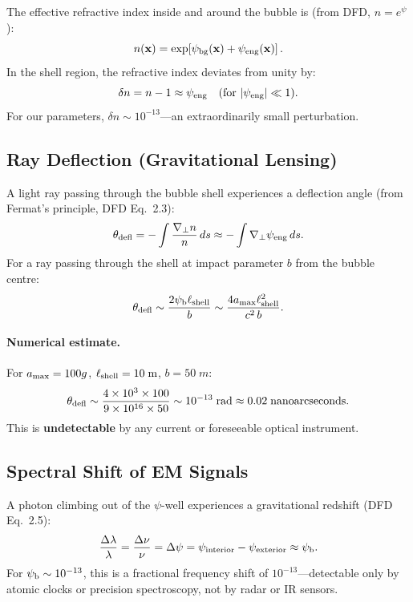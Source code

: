 \documentclass[12pt,aps,prd,superscriptaddress,nofootinbib]{revtex4-2}
\newcommand{\psib}{\psi_{\rm b}}
\newcommand{\Lshell}{\ell_{\rm shell}}
\begin{document}
The effective refractive index inside and around the bubble is
(from DFD, $n = e^{\psi}$):
\begin{equation}
n(\mathbf{x}) = \exp\!\left[\psi_{\rm bg}(\mathbf{x})
  + \psi_{\rm eng}(\mathbf{x})\right].
\end{equation}
In the shell region, the refractive index deviates from unity by:
\begin{equation}
\delta n = n - 1 \approx \psi_{\rm eng}
\quad (\text{for } |\psi_{\rm eng}| \ll 1).
\end{equation}
For our parameters, $\delta n \sim 10^{-13}$---an extraordinarily
small perturbation.

\subsection{Ray Deflection (Gravitational Lensing)}

A light ray passing through the bubble shell experiences a
deflection angle (from Fermat's principle, DFD Eq.~2.3):
\begin{equation}
\theta_{\rm defl} = -\int \frac{\nabla_\perp n}{n}\,ds
\approx -\int \nabla_\perp\psi_{\rm eng}\,ds.
\end{equation}
For a ray passing through the shell at impact parameter $b$
from the bubble centre:
\begin{equation}
\theta_{\rm defl} \sim \frac{2\psib\Lshell}{b}
\sim \frac{4a_{\rm max}\Lshell^2}{c^2\,b}.
\end{equation}

\paragraph{Numerical estimate.}
For $a_{\rm max} = 100g$, $\Lshell = 10\;\si{m}$, $b = 50\;\si{m}$:
\begin{equation}
\theta_{\rm defl} \sim \frac{4\times 10^3\times 100}
  {9\times 10^{16}\times 50} \sim 10^{-13}\;\text{rad}
\approx 0.02\;\text{nanoarcseconds}.
\end{equation}
This is \textbf{undetectable} by any current or foreseeable
optical instrument.

\subsection{Spectral Shift of EM Signals}

A photon climbing out of the $\psi$-well experiences a
gravitational redshift (DFD Eq.~2.5):
\begin{equation}
\frac{\Delta\lambda}{\lambda} = \frac{\Delta\nu}{\nu}
= \Delta\psi = \psi_{\rm interior} - \psi_{\rm exterior}
\approx \psib.
\end{equation}
For $\psib \sim 10^{-13}$, this is a fractional frequency shift
of $10^{-13}$---detectable only by atomic clocks or precision
spectroscopy, not by radar or IR sensors.
\end{document}
